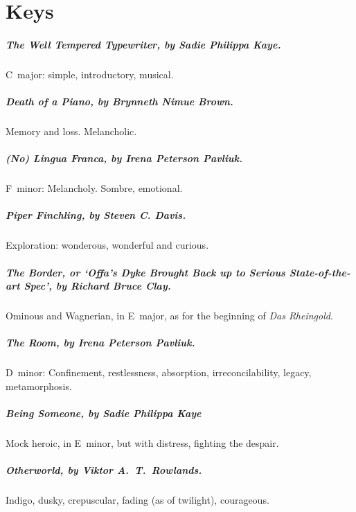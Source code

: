 \newcommand\keys{\chapter*{Keys}}
\keys

\paragraph{The Well Tempered Typewriter, by Sadie Philippa Kaye.} %
C~major: simple, introductory, musical.

\paragraph{Death of a Piano, by Brynneth Nimue Brown.} %
Memory and loss. Melancholic.

\paragraph{(No) Lingua Franca, by Irena Peterson Pavliuk.} %
F~minor: Melancholy. Sombre, emotional.

\paragraph{Piper Finchling, by Steven C. Davis.} %
Exploration: wonderous, wonderful and curious.

\paragraph{The Border, or `Offa's Dyke Brought Back up to Serious State-of-the-art Spec', 
by Richard Bruce Clay.} %
Ominous and Wagnerian, in E\fl~major, as for the beginning of \textit{Das Rheingold}.

\paragraph{The Room, by Irena Peterson Pavliuk.} %
D~minor: Confinement, restlessness, absorption, irreconcilability, legacy, metamorphosis.

\paragraph{Being Someone, by Sadie Philippa Kaye} %
Mock heroic, in E\fl~minor, but with distress, fighting the despair.

\paragraph{Otherworld, by Viktor A.~T.~Rowlands.} %
Indigo, dusky, crepuscular, fading (as of twilight), courageous.

